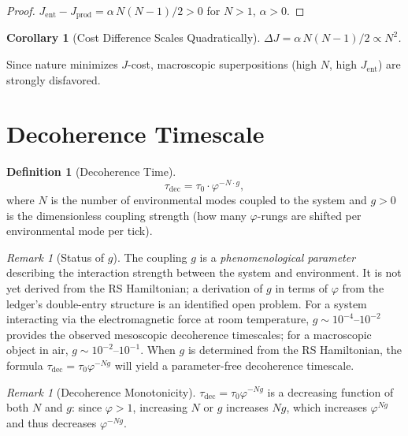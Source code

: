 \documentclass[12pt,a4paper]{article}
\newtheorem{corollary}[theorem]{Corollary}
\theoremstyle{definition}
\newtheorem{definition}[theorem]{Definition}
\theoremstyle{remark}
\newtheorem{remark}[theorem]{Remark}
\begin{document}
\begin{proof}
$J_{\mathrm{ent}} - J_{\mathrm{prod}} = \alpha\,N(N-1)/2 > 0$
for $N > 1$, $\alpha > 0$.
\end{proof}

\begin{corollary}[Cost Difference Scales Quadratically]
$\Delta J = \alpha\,N(N-1)/2 \propto N^2$.
\end{corollary}

Since nature minimizes $J$-cost, macroscopic superpositions (high
$N$, high $J_{\mathrm{ent}}$) are strongly disfavored.

\section{Decoherence Timescale}

\begin{definition}[Decoherence Time]
\begin{equation}
  \tau_{\mathrm{dec}} = \tau_0 \cdot \varphi^{-N \cdot g},
\end{equation}
where $N$ is the number of environmental modes coupled to the system
and $g > 0$ is the dimensionless coupling strength (how many $\varphi$-rungs
are shifted per environmental mode per tick).
\end{definition}

\begin{remark}[Status of $g$]
\label{rem:g-status}
The coupling $g$ is a \emph{phenomenological parameter} describing
the interaction strength between the system and environment.  It is
not yet derived from the RS Hamiltonian; a derivation of $g$ in terms
of $\varphi$ from the ledger's double-entry structure is an identified
open problem.  For a system interacting via the electromagnetic force
at room temperature, $g \sim 10^{-4}$--$10^{-2}$ provides the
observed mesoscopic decoherence timescales; for a macroscopic object
in air, $g \sim 10^{-2}$--$10^{-1}$.  When $g$ is determined from
the RS Hamiltonian, the formula $\tau_{\mathrm{dec}} = \tau_0 \varphi^{-Ng}$
will yield a parameter-free decoherence timescale.
\end{remark}

\begin{remark}[Decoherence Monotonicity]
$\tau_{\mathrm{dec}} = \tau_0 \varphi^{-Ng}$ is a decreasing
function of both $N$ and $g$: since $\varphi > 1$, increasing $N$ or
$g$ increases $Ng$, which increases $\varphi^{Ng}$ and thus decreases
$\varphi^{-Ng}$.
\end{remark}
\end{document}
